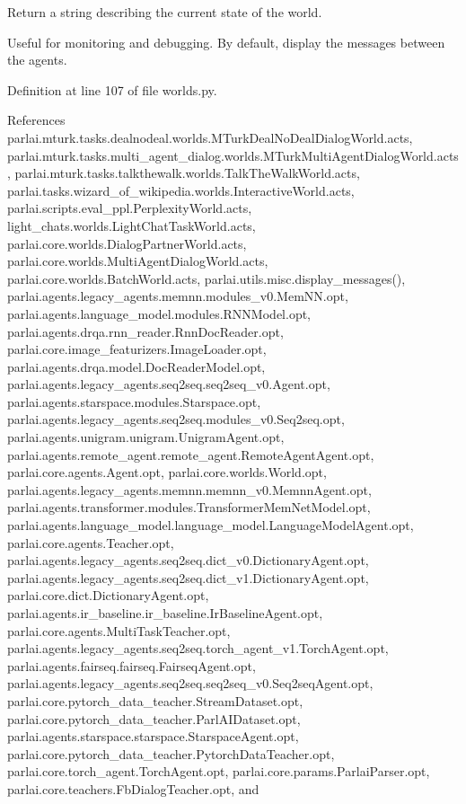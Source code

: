 \begin{DoxyVerb}Return a string describing the current state of the world.

Useful for monitoring and debugging.
By default, display the messages between the agents.
\end{DoxyVerb}
 

Definition at line 107 of file worlds.\+py.



References parlai.\+mturk.\+tasks.\+dealnodeal.\+worlds.\+M\+Turk\+Deal\+No\+Deal\+Dialog\+World.\+acts, parlai.\+mturk.\+tasks.\+multi\+\_\+agent\+\_\+dialog.\+worlds.\+M\+Turk\+Multi\+Agent\+Dialog\+World.\+acts, parlai.\+mturk.\+tasks.\+talkthewalk.\+worlds.\+Talk\+The\+Walk\+World.\+acts, parlai.\+tasks.\+wizard\+\_\+of\+\_\+wikipedia.\+worlds.\+Interactive\+World.\+acts, parlai.\+scripts.\+eval\+\_\+ppl.\+Perplexity\+World.\+acts, light\+\_\+chats.\+worlds.\+Light\+Chat\+Task\+World.\+acts, parlai.\+core.\+worlds.\+Dialog\+Partner\+World.\+acts, parlai.\+core.\+worlds.\+Multi\+Agent\+Dialog\+World.\+acts, parlai.\+core.\+worlds.\+Batch\+World.\+acts, parlai.\+utils.\+misc.\+display\+\_\+messages(), parlai.\+agents.\+legacy\+\_\+agents.\+memnn.\+modules\+\_\+v0.\+Mem\+N\+N.\+opt, parlai.\+agents.\+language\+\_\+model.\+modules.\+R\+N\+N\+Model.\+opt, parlai.\+agents.\+drqa.\+rnn\+\_\+reader.\+Rnn\+Doc\+Reader.\+opt, parlai.\+core.\+image\+\_\+featurizers.\+Image\+Loader.\+opt, parlai.\+agents.\+drqa.\+model.\+Doc\+Reader\+Model.\+opt, parlai.\+agents.\+legacy\+\_\+agents.\+seq2seq.\+seq2seq\+\_\+v0.\+Agent.\+opt, parlai.\+agents.\+starspace.\+modules.\+Starspace.\+opt, parlai.\+agents.\+legacy\+\_\+agents.\+seq2seq.\+modules\+\_\+v0.\+Seq2seq.\+opt, parlai.\+agents.\+unigram.\+unigram.\+Unigram\+Agent.\+opt, parlai.\+agents.\+remote\+\_\+agent.\+remote\+\_\+agent.\+Remote\+Agent\+Agent.\+opt, parlai.\+core.\+agents.\+Agent.\+opt, parlai.\+core.\+worlds.\+World.\+opt, parlai.\+agents.\+legacy\+\_\+agents.\+memnn.\+memnn\+\_\+v0.\+Memnn\+Agent.\+opt, parlai.\+agents.\+transformer.\+modules.\+Transformer\+Mem\+Net\+Model.\+opt, parlai.\+agents.\+language\+\_\+model.\+language\+\_\+model.\+Language\+Model\+Agent.\+opt, parlai.\+core.\+agents.\+Teacher.\+opt, parlai.\+agents.\+legacy\+\_\+agents.\+seq2seq.\+dict\+\_\+v0.\+Dictionary\+Agent.\+opt, parlai.\+agents.\+legacy\+\_\+agents.\+seq2seq.\+dict\+\_\+v1.\+Dictionary\+Agent.\+opt, parlai.\+core.\+dict.\+Dictionary\+Agent.\+opt, parlai.\+agents.\+ir\+\_\+baseline.\+ir\+\_\+baseline.\+Ir\+Baseline\+Agent.\+opt, parlai.\+core.\+agents.\+Multi\+Task\+Teacher.\+opt, parlai.\+agents.\+legacy\+\_\+agents.\+seq2seq.\+torch\+\_\+agent\+\_\+v1.\+Torch\+Agent.\+opt, parlai.\+agents.\+fairseq.\+fairseq.\+Fairseq\+Agent.\+opt, parlai.\+agents.\+legacy\+\_\+agents.\+seq2seq.\+seq2seq\+\_\+v0.\+Seq2seq\+Agent.\+opt, parlai.\+core.\+pytorch\+\_\+data\+\_\+teacher.\+Stream\+Dataset.\+opt, parlai.\+core.\+pytorch\+\_\+data\+\_\+teacher.\+Parl\+A\+I\+Dataset.\+opt, parlai.\+agents.\+starspace.\+starspace.\+Starspace\+Agent.\+opt, parlai.\+core.\+pytorch\+\_\+data\+\_\+teacher.\+Pytorch\+Data\+Teacher.\+opt, parlai.\+core.\+torch\+\_\+agent.\+Torch\+Agent.\+opt, parlai.\+core.\+params.\+Parlai\+Parser.\+opt, parlai.\+core.\+teachers.\+Fb\+Dialog\+Teacher.\+opt, and 